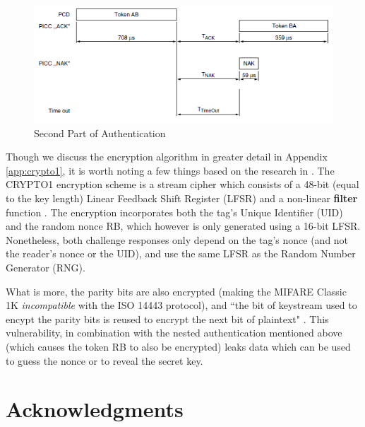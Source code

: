 \documentclass[fleqn,10pt]{SelfArx} %
\begin{document}
\begin{figure}[h]
  \includegraphics[width=\linewidth]{img/auth2.png}
  \caption{Second Part of Authentication \cite{classic1k}}
  \label{fig:auth2}
\end{figure}

Though we discuss the encryption algorithm in greater detail in Appendix \ref{app:crypto1}, it is worth noting a few things based on the research in \cite{crypto1, classicvulnerabilities}. The CRYPTO1 encryption scheme is a stream cipher which consists of a 48-bit (equal to the key length) Linear Feedback Shift Register (LFSR) and a non-linear {\bf filter} function \cite{crypto1}. The encryption incorporates both the tag's Unique Identifier (UID) and the random nonce RB, which however is only generated using a 16-bit LFSR. Nonetheless, both challenge responses only depend on the tag's nonce (and not the reader's nonce or the UID), and use the same LFSR as the Random Number Generator (RNG). 

What is more, the parity bits are also encrypted (making the MIFARE Classic 1K {\em incompatible} with the ISO 14443 protocol), and ``the bit of keystream used to encypt the parity bits is reused to encrypt the next bit of plaintext" \cite{classicvulnerabilities}. This vulnerability, in combination with the nested authentication mentioned above (which causes the token RB to also be encrypted) leaks data which can be used to guess the nonce or to reveal the secret key.




\section*{Acknowledgments} %
\end{document}
